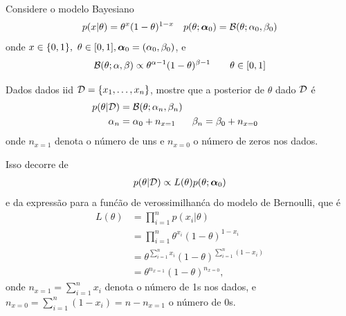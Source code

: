\label{ex:Bayesian-inference-Bernoulli-alt}
Considere o modelo Bayesiano
\begin{align*}
    p(x | \theta) &= \theta^x (1-\theta)^{1-x} & p(\theta ; \boldsymbol{\alpha}_0) = \mathcal{B}(\theta ; \alpha_0, \beta_0)
\end{align*}
onde $x \in \{0,1\}, \ \theta \in [0,1], \alphab_0 = (\alpha_0,\beta_0)$, e
\begin{equation}
    \mathcal{B}(\theta; \alpha, \beta) \propto \theta^{\alpha-1}(1-\theta)^{\beta-1} \quad \quad \theta \in [0,1]
\end{equation}

\begin{exenumerate}
    \item Dados dados iid $\mathcal{D} = \{x_1, \ldots, x_n\}$, mostre que a posterior de $\theta$ dado $\mathcal{D}$ \'e
    \begin{align*}
        p(\theta | \mathcal{D}) &= \mathcal{B}(\theta ; \alpha_n, \beta_n)\\
        \alpha_n &= \alpha_0 + n_{x=1} & \beta_n &= \beta_0 + n_{x=0}
    \end{align*}
    onde $n_{x=1}$ denota o n\'umero de uns e $n_{x=0}$ o n\'umero de zeros nos dados.
    
    \begin{solution}
        Isso decorre de
        \begin{align}
            p(\theta | \mathcal{D}) \propto L(\theta) p(\theta ; \boldsymbol{\alpha}_0) \label{eq:Bernoulli-posterior-def-alt}
        \end{align}
        e da express\~ao para a fun\'c\~ao de verossimilhan\'ca do modelo de Bernoulli, que \'e
        \begin{align}
            L(\theta) &= \prod_{i=1}^n p(x_i|\theta)\\
            & = \prod_{i=1}^n  \theta^{x_i} (1-\theta)^{1-x_i}\\
            & = \theta^{\sum_{i=1}^n x_i} (1-\theta)^{\sum_{i=1}^n (1-x_i)}\\
            & = \theta^{n_{x=1}}(1-\theta)^{n_{x=0}},
        \end{align}
        onde $n_{x=1} = \sum_{i=1}^n x_i$ denota o n\'umero de 1s nos
        dados, e $n_{x=0}=\sum_{i=1}^n (1-x_i)=n-n_{x=1}$ o n\'umero
        de 0s.
        

\end{solution}
\end{exenumerate}

